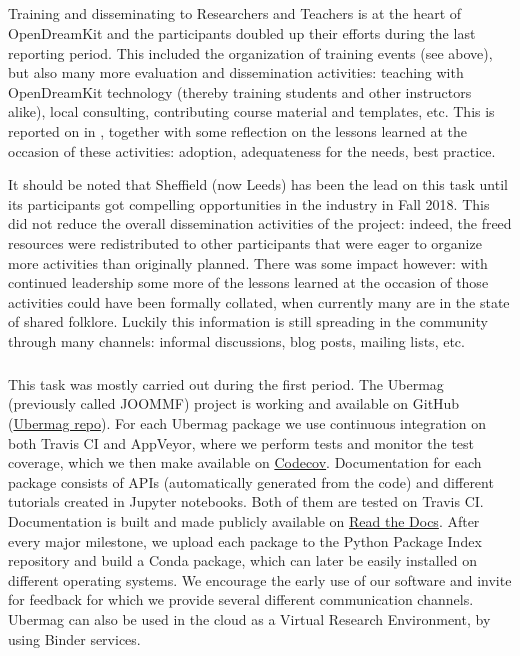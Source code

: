 \subparagraph{}


Training and disseminating to Researchers and Teachers is at the heart
of OpenDreamKit and the participants doubled up their efforts during
the last reporting period. This included the organization of training
events (see  above), but also many
more evaluation and dissemination activities: teaching with
OpenDreamKit technology (thereby training students and other
instructors alike), local consulting, contributing course material and
templates, etc. This is reported on in
, together with some reflection on the
lessons learned at the occasion of these activities: adoption,
adequateness for the needs, best practice.

It should be noted that Sheffield (now Leeds) has been the lead on
this task until its participants got compelling opportunities in the
industry in Fall 2018. This did not reduce the overall dissemination
activities of the project: indeed, the freed resources were
redistributed to other participants that were eager to organize more
activities than originally planned. There was some impact however:
with continued leadership some more of the lessons learned at the
occasion of those activities could have been formally collated, when
currently many are in the state of shared folklore. Luckily this
information is still spreading in the community through many channels:
informal discussions, blog posts, mailing lists, etc.


\subparagraph{}
\label{dissem@dissemination-of-oommf-nb-virtual-environment}


This task was mostly carried out during the first period. The Ubermag
(previously called JOOMMF) project is working and available on GitHub
(\href{https://github.com/ubermag}{Ubermag repo}). For each Ubermag
package we use continuous integration on both Travis CI and AppVeyor,
where we perform tests and monitor the test coverage, which we then
make available on \href{https://codecov.io/}{Codecov}. Documentation
for each package consists of APIs (automatically generated from the
code) and different tutorials created in Jupyter notebooks. Both of
them are tested on Travis CI. Documentation is built and made publicly
available on \href{http://discretisedfield.readthedocs.io}{Read the
  Docs}. After every major milestone, we upload each package to the
Python Package Index repository and build a Conda package, which can
later be easily installed on different operating systems. We encourage
the early use of our software and invite for feedback for which we
provide several different communication channels. Ubermag can also be
used in the cloud as a Virtual Research Environment, by using Binder
services.

